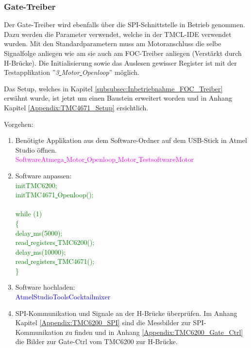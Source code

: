 \subsubsection{Gate-Treiber}
\label{subsubsec:Inbetriebnahme_Gate_Treiber}

Der Gate-Treiber wird ebenfalls über die SPI-Schnittstelle in Betrieb genommen. Dazu werden die Parameter verwendet, welche in der TMCL-IDE verwendet wurden. Mit den Standardparametern muss am Motoranschluss die selbe Signalfolge anliegen wie am sie auch am FOC-Treiber anliegen (Verstärkt durch H-Brücke). Die Initialisierung sowie das Auslesen gewisser Register ist mit der Testapplikation ''\textit{3\underline{ }Motor\underline{ }Openloop}'' möglich.

Das Setup, welches in Kapitel \ref{subsubsec:Inbetriebnahme_FOC_Treiber} erwähnt wurde, ist jetzt um einen Baustein erweitert worden und in Anhang Kapitel \ref{Appendix:TMC4671_Setup} ersichtlich.

Vorgehen:
\begin{enumerate}
\item Benötigte Applikation aus dem Software-Ordner auf dem USB-Stick in Atmel Studio öffnen.\\
\textcolor{magenta}{Software\textrightarrow Atmega\underline{ }Motor\underline{ }Openloop\underline{ }Motor\underline{ }Testsoftware\textrightarrow Motor}\\


\item Software anpassen:\\
\textcolor{green}{
	initTMC6200;\\
	initTMC4671\underline{ }Openloop();\\
\\
    while (1) \\
    \{\\
		\underline{ }delay\underline{ }ms(5000);\\
		read\underline{ }registers\underline{ }TMC6200();\\
		\underline{ }delay\underline{ }ms(10000);\\
		read\underline{ }registers\underline{ }TMC4671();\\
    \}
}
\item Software hochladen:\\
\textcolor{blue}{AtmelStudio\textrightarrow Tools\textrightarrow Cocktailmixer}\\

\item SPI-Kommunikation und Signale an der H-Brücke überprüfen. Im Anhang Kapitel \ref{Appendix:TMC6200_SPI} sind die Messbilder zur SPI-Kommunikation zu finden und in Anhang \ref{Appendix:TMC6200_Gate_Ctrl} die Bilder zur Gate-Ctrl vom TMC6200 zur H-Brücke.

\end{enumerate}